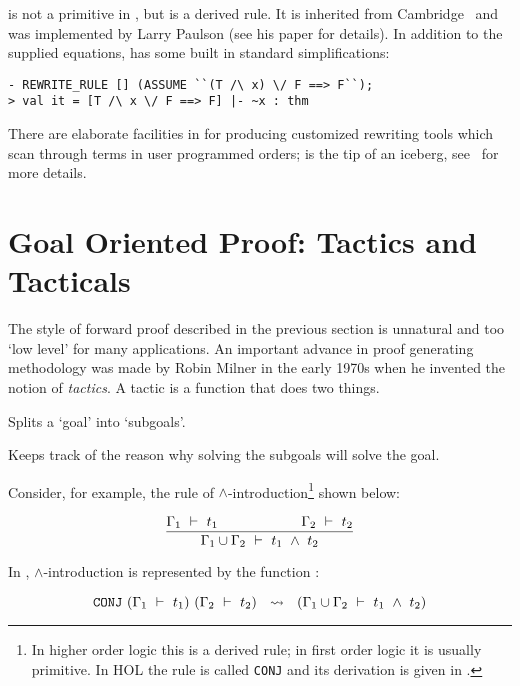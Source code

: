      is not a primitive in \HOL, but is a derived
    rule. It is inherited from Cambridge \LCF\ and was implemented by
    Larry Paulson (see his paper \cite{lcp_rewrite} for details). In
    addition to the supplied equations,  has some
    built in standard simplifications:

\begin{session}\begin{verbatim}
- REWRITE_RULE [] (ASSUME ``(T /\ x) \/ F ==> F``);
> val it = [T /\ x \/ F ==> F] |- ~x : thm
\end{verbatim}\end{session}

    There are elaborate facilities in \HOL{} for producing customized
    rewriting tools which scan through terms in user programmed
    orders;  is the tip of an iceberg, see
    \DESCRIPTION\ for more details.

\section{Goal Oriented Proof: Tactics and Tacticals}
\label{backward}\label{tactics}

The style of forward proof described in the previous section is
unnatural and too `low level' for many applications. An important
advance in proof generating methodology was made by Robin Milner in
the early 1970s when he invented the notion of {\it tactics\/}. A
tactic is a function that does two things.
\begin{myenumerate}
\item Splits a `goal' into `subgoals'.
\item Keeps track of the reason why solving the subgoals will solve the goal.
\end{myenumerate}

\noindent Consider, for example, the  rule of $\wedge$-introduction\footnote{In
  higher order logic this is a derived rule; in first order logic it
  is usually primitive.  In HOL the rule is called {\tt CONJ} and its
  derivation is given in \DESCRIPTION.}  shown below:

\[ \frac{\Gamma_1\ \vdash\ 
t_1\qquad\qquad\qquad\Gamma_2\ \vdash\  t_2}{\Gamma_1\cup\Gamma_2 \ \vdash\  t_1\ \wedge\ 
t_2} \]


\noindent In \HOL,  $\wedge$-introduction is  represented by  the \ML{} function
:

\[\ml{CONJ}\ (\Gamma_1\turn t_1)\ (\Gamma_2\turn t_2) \ \ \leadsto\
\ (\Gamma_1\cup\Gamma_2\turn  t_1\conj  t_2)\]


